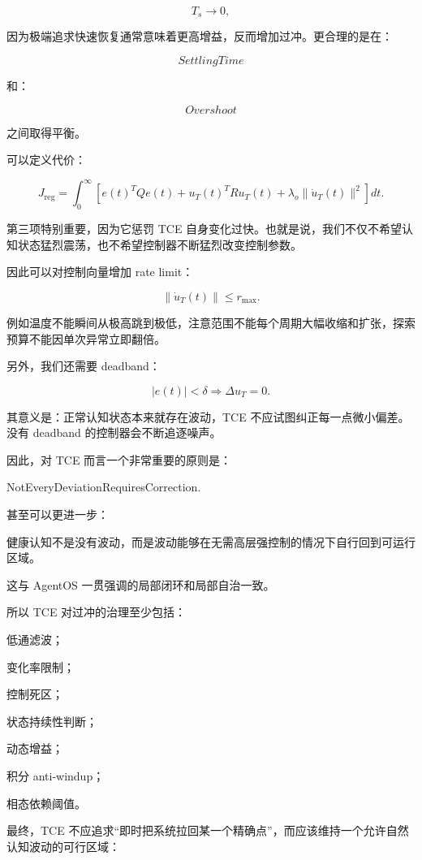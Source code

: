 \[
T_s\rightarrow0,
\]

因为极端追求快速恢复通常意味着更高增益，反而增加过冲。更合理的是在：

\[
SettlingTime
\]

和：

\[
Overshoot
\]

之间取得平衡。

可以定义代价：

\[
J_{\mathrm{reg}}
=
\int_0^\infty
\left[
e(t)^TQe(t)
+
u_T(t)^TRu_T(t)
+
\lambda_o
\|\dot u_T(t)\|^2
\right]dt.
\]

第三项特别重要，因为它惩罚 TCE 自身变化过快。也就是说，我们不仅不希望认知状态猛烈震荡，也不希望控制器不断猛烈改变控制参数。

因此可以对控制向量增加 rate limit：

\[
\|\dot u_T(t)\|
\le
r_{\max}.
\]

例如温度不能瞬间从极高跳到极低，注意范围不能每个周期大幅收缩和扩张，探索预算不能因单次异常立即翻倍。

另外，我们还需要 deadband：

\[
|e(t)|<\delta
\Rightarrow
\Delta u_T=0.
\]

其意义是：正常认知状态本来就存在波动，TCE 不应试图纠正每一点微小偏差。没有 deadband 的控制器会不断追逐噪声。

因此，对 TCE 而言一个非常重要的原则是：

\begin{statementbox}
NotEveryDeviationRequiresCorrection.
\end{statementbox}

甚至可以更进一步：

\begin{statementbox}
健康认知不是没有波动，而是波动能够在无需高层强控制的情况下自行回到可运行区域。
\end{statementbox}

这与 AgentOS 一贯强调的局部闭环和局部自治一致。

所以 TCE 对过冲的治理至少包括：

低通滤波；

变化率限制；

控制死区；

状态持续性判断；

动态增益；

积分 anti-windup；

相态依赖阈值。

最终，TCE 不应追求“即时把系统拉回某一个精确点”，而应该维持一个允许自然认知波动的可行区域：

